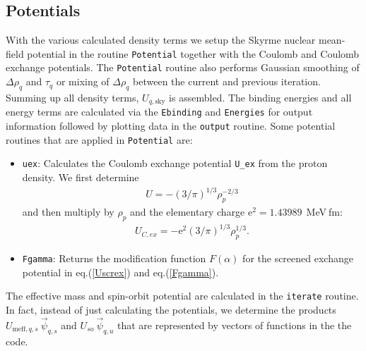 \documentclass[4p]{elsarticle}
\begin{document}
\subsection{Potentials}
\label{section::potential}
With the various calculated density terms we setup the Skyrme nuclear mean-field potential in the routine \texttt{Potential} together with the Coulomb and Coulomb exchange potentials. The \texttt{Potential} routine also performs Gaussian smoothing of $\Delta \rho_q$ and $\tau_q$ or mixing of $\Delta \rho_q$ between the current and previous iteration. Summing up all density terms, $U_{q,\mathrm{sky}}$ is assembled. The binding energies and all energy terms are calculated via the \texttt{Ebinding} and \texttt{Energies} for output information followed by plotting data in the \texttt{output} routine. Some potential routines that are applied in \texttt{Potential} are:
\begin{itemize}
\item \texttt{uex}: Calculates the Coulomb exchange potential \texttt{U\_{ex}} from the proton density. We first determine 
\begin{align}
U = - \left( 3 / \pi \right)^{1/3} \rho_p^{-2/3}
\end{align}
and then multiply by $\rho_p$ and the elementary charge $\mathrm{e}^2 = 1.43989\:\:$MeV$\:$fm:
\begin{align}
U_{C,ex} = - \mathrm{e}^2 \left(3 / \pi \right)^{1/3} \rho_p^{1/3}.
\end{align}
\item \texttt{Fgamma}: Returns the modification function $F(\alpha)$ for the screened exchange potential in eq.(\ref{Uscrex}) and eq.(\ref{Fgamma}). 
\end{itemize}
The effective mass and spin-orbit potential are calculated in the \texttt{iterate} routine. In fact, instead of just calculating the potentials, we determine the products $U_{\mathrm{meff},q,s} \: \vec{\psi}_{q,s}$ and $U_{so} \: \vec{\psi}_{q,u}$ that are represented by vectors of functions in the the code. 
\end{document}
